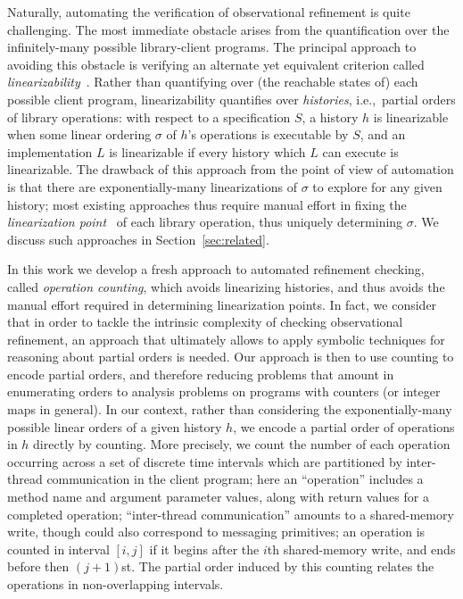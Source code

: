 Naturally, automating the verification of observational refinement is quite
challenging. The most immediate obstacle arises from the quantification over
the infinitely-many possible library-client programs. The principal approach to
avoiding this obstacle is verifying an alternate yet equivalent criterion
called \emph{linearizability}~\citep{journals/toplas/HerlihyW90}. Rather than
quantifying over (the reachable states of) each possible client program,
linearizability quantifies over \emph{histories}, i.e.,~partial orders of
library operations: with respect to a specification $S$, a history $h$ is
linearizable when some linear ordering $\sigma$ of $h$'s operations is
executable by $S$, and an implementation $L$ is linearizable if every history
which $L$ can execute is linearizable. The drawback of this approach from the
point of view of automation is that there are exponentially-many linearizations
of $\sigma$ to explore for any given history; most existing approaches thus
require manual effort in fixing the \emph{linearization point}~\citep{
journals/toplas/HerlihyW90} of each library operation, thus uniquely
determining $\sigma$. 
We discuss such approaches in Section~\ref{sec:related}.

In this work  we develop a fresh approach to automated refinement checking, called \emph{operation counting}, which avoids linearizing histories, and thus avoids the manual effort required in determining linearization points. In fact, we consider that in order to tackle the intrinsic complexity of checking observational refinement, an approach that ultimately allows to apply symbolic techniques for reasoning about partial orders is needed. Our approach is then to use counting to encode partial orders, and therefore reducing problems that amount in enumerating orders to analysis problems on programs with counters (or integer maps in general).
%
In our context, rather than considering the exponentially-many possible linear orders of a given history $h$, we encode a partial order of operations in $h$ directly by counting. More precisely, we count the number of each operation occurring across a set of discrete time intervals which are partitioned by inter-thread communication in
the client program; here an ``operation'' includes a method name and argument
parameter values, along with return values for a completed operation;
``inter-thread communication'' amounts to a shared-memory write, though could
also correspond to messaging primitives; an operation is counted in interval
$[i,j]$ if it begins after the $i$th shared-memory write, and ends before then
$(j\!+\! 1)$st. The partial order induced by this counting relates the operations in non-overlapping intervals.

